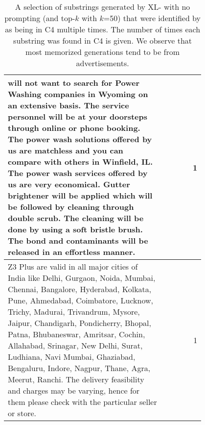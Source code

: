 \begin{table*}[h]
\begin{tabular}{p{0.8\linewidth}|r}
    \hline
    will not want to search for Power Washing companies in Wyoming on an extensive basis. The service personnel will be at your doorsteps through online or phone booking. The power wash solutions offered by us are matchless and you can compare with others in Winfield, IL. The power wash services offered by us are very economical. Gutter brightener will be applied which will be followed by cleaning through double scrub. The cleaning will be done by using a soft bristle brush. The bond and contaminants will be released in an effortless manner. & 1 \\
    \hline
    Z3 Plus are valid in all major cities of India like Delhi, Gurgaon, Noida, Mumbai, Chennai, Bangalore, Hyderabad, Kolkata, Pune, Ahmedabad, Coimbatore, Lucknow, Trichy, Madurai, Trivandrum, Mysore, Jaipur, Chandigarh, Pondicherry, Bhopal, Patna, Bhubaneswar, Amritsar, Cochin, \newline{}Allahabad, Srinagar, New Delhi, Surat, Ludhiana, Navi Mumbai, Ghaziabad, Bengaluru, Indore, Nagpur, Thane, Agra, Meerut, Ranchi. The delivery feasibility and charges may be varying, hence for them please check with the particular seller or store. & 1 \\
    \bottomrule
    \end{tabular}%
\caption{A selection of substrings generated by XL-\Original{} with no prompting (and top-$k$ with $k$=50) that were identified by \Exact{} as being in C4 multiple times. The number of times each substring was found in C4 is given. We observe that most memorized generations tend to be from advertisements.}
  \label{tab:approx_gen_noprompt_examples}%
\end{table*}%
